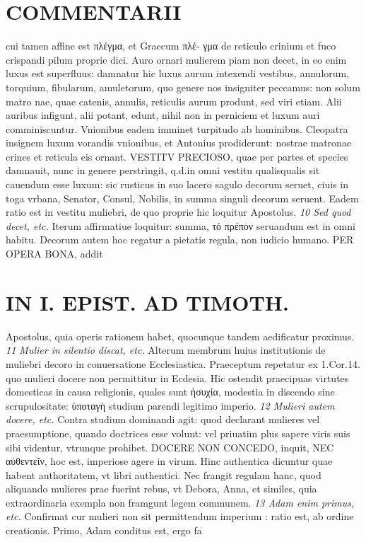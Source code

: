 \documentclass{article}
\begin{document}
\begin{pages}
\section*{COMMENTARII }
\marginpar{[ p.56 ]}\pstart cui tamen affine est πλέγμα, et Graecum πλέ- γμα de reticulo crinium et fuco crispandi pilum proprie dici.  \pend\pstart Auro ornari mulierem piam non decet, in eo enim luxus est superfluus: damnatur hic luxus aurum intexendi vestibus, annulorum, torquium, fibularum, amuletorum, quo genere nos insigniter peccamus: non solum matro nae, quae catenis, annulis, reticulis aurum produnt, sed viri etiam. Alii auribus infigunt, alii potant, edunt, nihil non in perniciem et luxum auri comminiscuntur.  \pend\pstart Vnionibus eadem imminet turpitudo ab hominibus. Cleopatra insignem luxum vorandis vnionibus, et Antonius prodiderunt: nostrae matronae crines et reticula eis ornant. VESTITV PRECIOSO, quae per partes et species damnauit, nunc in genere perstringit, q.d.in omni vestitu qualisqualis sit cauendum esse luxum: sic rusticus in suo lacero sagulo decorum seruet, ciuis in toga vrbana, Senator, Consul, Nobilis, in summa singuli decorum seruent. Eadem ratio est in vestitu muliebri, de quo proprie hic loquitur Apostolus.  \pend
\textit{10 Sed quod decet, etc. }\pstart Iterum affirmatiue loquitur: summa, τό πρέπον seruandum est in omni habitu. Decorum autem hoc regatur a pietatis regula, non iudicio humano. PER OPERA BONA, addit  \pend
\section*{IN I. EPIST. AD TIMOTH. }
\marginpar{[ p.57 ]}\pstart Apostolus, quia operis rationem habet, quocunque tandem aedificatur proximus.  \pend
\textit{11 Mulier in silentio discat, etc. }\pstart Alterum membrum huius institutionis de muliebri decoro in conuersatione Ecclesiastica. Praeceptum repetatur ex 1.Cor.14. quo mulieri docere non permittitur in Ecdesia. Hic ostendit praecipuas virtutes domesticas in causa religionis, quales sunt ἡσυχία, modestia in discendo sine scrupulositate: ὑποταγὴ studium parendi legitimo imperio.  \pend
\textit{12 Mulieri autem docere, etc. }\pstart Contra studium dominandi agit: quod declarant mulieres vel praesumptione, quando doctrices esse volunt: vel priuatim plus sapere viris suis sibi videntur, vtrunque prohibet. DOCERE NON CONCEDO, inquit, NEC αὐθεντεῖν, hoc est, imperiose agere in virum. Hinc authentica dicuntur quae habent authoritatem, vt libri authentici. Nec frangit regulam hanc, quod aliquando mulieres prae fuerint rebus, vt Debora, Anna, et similes, quia extraordinaria exempla non framgunt legem communem.  \pend
\textit{13 Adam enim primus, etc. }\pstart Confirmat cur mulieri non sit permittendum imperium : ratio est, ab ordine creationis. Primo, Adam conditus est, ergo fa\pend

\end{pages}
\end{document}
